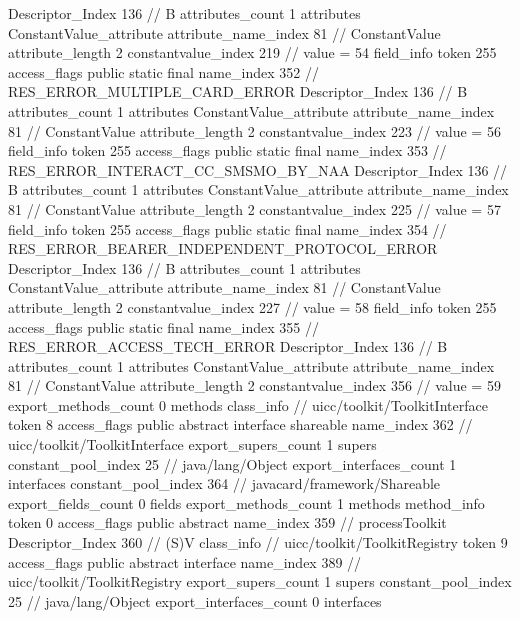 {{{{{				Descriptor_Index	136		// B
				attributes_count	1
				attributes {
				ConstantValue_attribute {
					attribute_name_index	81		// ConstantValue
					attribute_length	2
					constantvalue_index	219		// value = 54
				}
				}
			}
			field_info {
				token	255
				access_flags	public static final
				name_index	352		// RES_ERROR_MULTIPLE_CARD_ERROR
				Descriptor_Index	136		// B
				attributes_count	1
				attributes {
				ConstantValue_attribute {
					attribute_name_index	81		// ConstantValue
					attribute_length	2
					constantvalue_index	223		// value = 56
				}
				}
			}
			field_info {
				token	255
				access_flags	public static final
				name_index	353		// RES_ERROR_INTERACT_CC_SMSMO_BY_NAA
				Descriptor_Index	136		// B
				attributes_count	1
				attributes {
				ConstantValue_attribute {
					attribute_name_index	81		// ConstantValue
					attribute_length	2
					constantvalue_index	225		// value = 57
				}
				}
			}
			field_info {
				token	255
				access_flags	public static final
				name_index	354		// RES_ERROR_BEARER_INDEPENDENT_PROTOCOL_ERROR
				Descriptor_Index	136		// B
				attributes_count	1
				attributes {
				ConstantValue_attribute {
					attribute_name_index	81		// ConstantValue
					attribute_length	2
					constantvalue_index	227		// value = 58
				}
				}
			}
			field_info {
				token	255
				access_flags	public static final
				name_index	355		// RES_ERROR_ACCESS_TECH_ERROR
				Descriptor_Index	136		// B
				attributes_count	1
				attributes {
				ConstantValue_attribute {
					attribute_name_index	81		// ConstantValue
					attribute_length	2
					constantvalue_index	356		// value = 59
				}
				}
			}
			}
			export_methods_count	0
			methods {
			}
		}
		class_info {		// uicc/toolkit/ToolkitInterface
			token	8
			access_flags	public abstract interface shareable
			name_index	362		// uicc/toolkit/ToolkitInterface
			export_supers_count	1
			supers {
				constant_pool_index	25		// java/lang/Object
			}
			export_interfaces_count	1
			interfaces {
				constant_pool_index	364		// javacard/framework/Shareable
			}
			export_fields_count	0
			fields {
			}
			export_methods_count	1
			methods {
				method_info {
					token	0
					access_flags	public abstract
					name_index	359		// processToolkit
					Descriptor_Index	360		// (S)V
				}
			}
		}
		class_info {		// uicc/toolkit/ToolkitRegistry
			token	9
			access_flags	public abstract interface
			name_index	389		// uicc/toolkit/ToolkitRegistry
			export_supers_count	1
			supers {
				constant_pool_index	25		// java/lang/Object
			}
			export_interfaces_count	0
			interfaces {
}}}}
